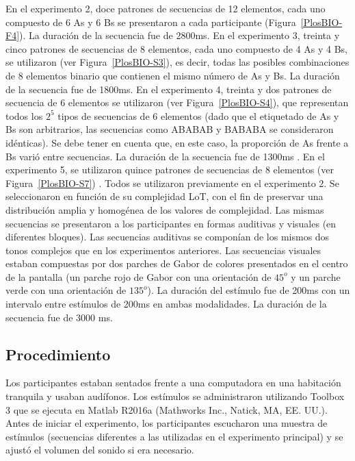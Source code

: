 En el experimento 2, doce patrones de secuencias de 12 elementos, cada uno compuesto de 6 As y 6 Bs se presentaron a cada participante (Figura~\ref{PlosBIO-F4}). La duración de la secuencia fue de 2800ms. En el experimento 3, treinta y cinco patrones de secuencias de 8 elementos, cada uno compuesto de 4 As y 4 Bs, se utilizaron (ver Figura~\ref{PlosBIO-S3}), es decir, todas las posibles combinaciones de 8 elementos binario que contienen el mismo número de As y Bs. La duración de la secuencia fue de 1800ms. En el experimento 4, treinta y dos patrones de secuencia de 6 elementos se utilizaron (ver Figura~\ref{PlosBIO-S4}), que representan todos los $2^5$ tipos de secuencias de 6 elementos (dado que el etiquetado de As y Bs son arbitrarios, las secuencias como ABABAB y BABABA se consideraron idénticas). Se debe tener en cuenta que, en este caso, la proporción de As frente a Bs varió entre secuencias. La duración de la secuencia fue de 1300ms . En el experimento 5, se utilizaron quince patrones de secuencias de 8 elementos (ver Figura~\ref{PlosBIO-S7}) . Todos se utilizaron previamente en el experimento 2. Se seleccionaron en función de su complejidad LoT, con el fin de preservar una distribución amplia y homogénea de los valores de complejidad. Las mismas secuencias se presentaron a los participantes en formas auditivas y visuales (en diferentes bloques). Las secuencias auditivas se componían de los mismos dos tonos complejos que en los experimentos anteriores. Las secuencias visuales estaban compuestas por dos parches de Gabor de colores presentados en el centro de la pantalla (un parche rojo de Gabor con una orientación de $45^o$ y un parche verde con una orientación de $135^o$). La duración del estímulo fue de 200ms con un intervalo entre estímulos de 200ms en ambas modalidades. La duración de la secuencia fue de 3000 ms.

\subsection{Procedimiento}


Los participantes estaban sentados frente a una computadora en una habitación tranquila y usaban audífonos. Los estímulos se administraron utilizando  Toolbox 3 \cite{f134,f135} que se ejecuta en Matlab R2016a (Mathworks Inc., Natick, MA, EE. UU.). Antes de iniciar el experimento, los participantes escucharon una muestra de estímulos (secuencias diferentes a las utilizadas en el experimento principal) y se ajustó el volumen del sonido si era necesario.

